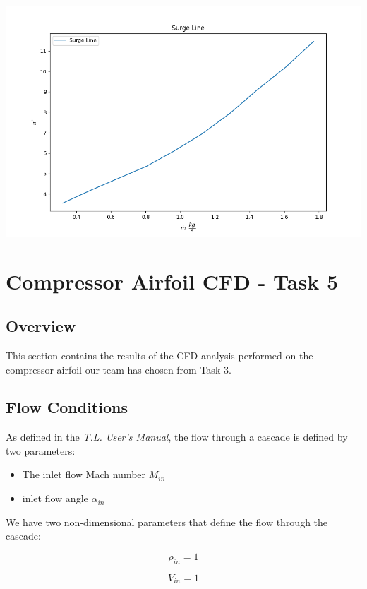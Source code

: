 \documentclass[titlepage]{article}
\begin{document}
\begin{enumerate}
\begin{center}
        \includegraphics[width=\textwidth]{CompressorMap3.png}

    \end{center}
\end{enumerate}

\section{Compressor Airfoil CFD - Task 5}

\subsection{Overview}
This section contains the results of the CFD analysis performed on the compressor airfoil our team has chosen from Task 3.

\subsection{Flow Conditions}
As defined in the \textit{T.L. User's Manual}, the flow through a cascade is defined by two parameters:
\begin{itemize}
\item The inlet flow Mach number $M_{in}$
\item inlet flow angle $\alpha_{in}$
\end{itemize}

We have two non-dimensional parameters that define the flow through the cascade:

\begin{equation}
\label{eq:non-dim rho}
\rho_{in} = 1
\end{equation}

\begin{equation}
\label{eq:non-dim v}
V_{in} = 1
\end{equation}
\end{document}
